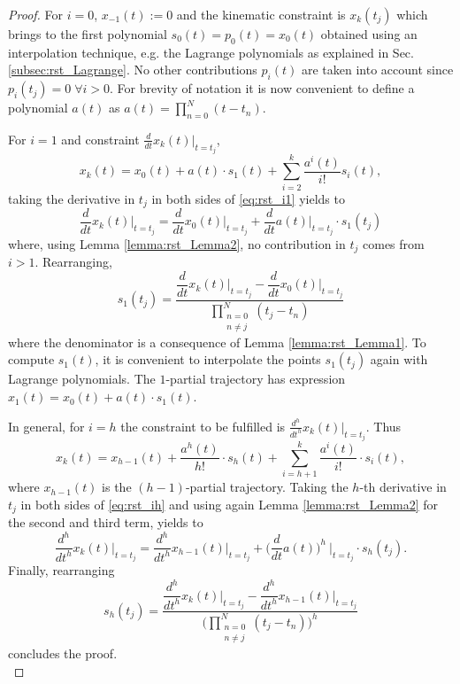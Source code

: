\begin{proof}
For $i=0$, $x_{-1}(t):=0$ and the kinematic constraint is $x_k(t_j)$ which brings to the first polynomial $s_0(t)=p_0(t)=x_0(t)$ obtained using an interpolation technique, e.g. the Lagrange polynomials as explained in Sec. \ref{subsec:rst_Lagrange}. No other contributions $p_i(t)$ are taken into account since $p_i(t_j)=0 \; \forall i>0$. For brevity of notation it is now convenient to define a polynomial $a(t)$ as $a(t) = \prod_{n=0}^{N}{(t-t_n)}$.

For $i=1$ and constraint $\frac{d}{dt}x_k(t)\bigr|_{t=t_j}$, 
\begin{equation}
x_k(t) = x_0(t) + a(t)\cdot s_1(t) + \sum_{i=2}^{k}{\dfrac{a^i(t)}{i!}s_i(t)},
\label{eq:rst_i1}
\end{equation}
taking the derivative in $t_j$ in both sides of \eqref{eq:rst_i1} yields to
\begin{equation}
\frac{d}{dt}x_k(t)\biggr|_{t=t_j} = \frac{d}{dt}x_0(t)\biggr|_{t=t_j} + \frac{d}{dt}a(t)\biggr|_{t=t_j}\cdot s_1(t_j)
\end{equation}
where, using Lemma \ref{lemma:rst_Lemma2}, no contribution in $t_j$ comes from $i>1$. Rearranging,
\begin{equation}
s_1(t_j)=\dfrac{\dfrac{d}{dt}x_k(t)\biggr|_{t=t_j} -\dfrac{d}{dt}x_0(t)\biggr|_{t=t_j}}{\displaystyle \prod_{\substack{n=0\\ n\neq j}}^{N}{(t_j-t_n)}}
\end{equation}
where the denominator is a consequence of Lemma \ref{lemma:rst_Lemma1}.
To compute $s_1(t)$, it is convenient to interpolate the points $s_1(t_j)$ again with Lagrange polynomials. The $1$-partial trajectory has expression $x_1(t)=x_0(t)+a(t)\cdot s_1(t)$.

In general, for $i=h$ the constraint to be fulfilled is $\frac{d^h}{dt^h}x_k(t)\bigr|_{t=t_j}$. Thus
\begin{equation}
x_k(t) = x_{h-1}(t) + \dfrac{a^h(t)}{h!}\cdot s_h(t) + \sum_{i=h+1}^{k}{\dfrac{a^i(t)}{i!}\cdot s_i(t)},
\label{eq:rst_ih}
\end{equation}
where $x_{h-1}(t)$ is the $(h-1)$-partial trajectory. Taking the $h$-th derivative in $t_j$ in both sides of \eqref{eq:rst_ih} and using again Lemma \ref{lemma:rst_Lemma2} for the second and third term, yields to
\begin{equation}
\frac{d^h}{dt^h}x_k(t)\biggr|_{t=t_j} = \frac{d^h}{dt^h}x_{h-1}(t)\biggr|_{t=t_j} + \biggl(\frac{d}{dt}a(t)\biggr)^h\ \biggr|_{t=t_j} \cdot s_h(t_j).
\end{equation}
Finally, rearranging
\begin{equation}
s_h(t_j)=\dfrac{\dfrac{d^h}{dt^h}x_k(t)\biggr|_{t=t_j} -\dfrac{d^h}{dt^h}x_{h-1}(t)\biggr|_{t=t_j}}{\displaystyle \Biggl(\prod_{\substack{n=0\\ n\neq j}}^{N}{(t_j-t_n)}\Biggr)^h}
\end{equation}
concludes the proof. \\ \qedhere  
\end{proof}

